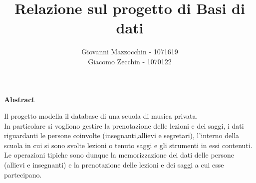 \documentclass{article}
\begin{document}
\title{\textbf{Relazione sul progetto di Basi di dati}}

\author{Giovanni Mazzocchin - 1071619\\ Giacomo Zecchin - 1070122}
\maketitle

\tableofcontents  %

\newpage


\begin{center}
\textbf{Abstract}
\end{center}
\begin{flushleft}
Il progetto modella il database di una scuola di musica privata.\\
In particolare si vogliono gestire la prenotazione delle lezioni e dei saggi, i dati riguardanti le persone coinvolte (insegnanti,allievi e segretari), l'interno della scuola in cui si sono svolte lezioni o tenuto saggi e gli strumenti in essi contenuti.
Le operazioni tipiche sono dunque la memorizzazione dei dati delle persone (allievi e insegnanti) e la prenotazione delle lezioni e dei saggi a cui esse partecipano.
\end{flushleft}

\end{document}
